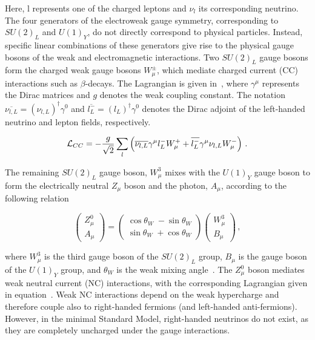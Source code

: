 \noindent Here, $\text{l}$ represents one of the charged leptons and $\nu_l$ its corresponding neutrino.
The four generators of the electroweak gauge symmetry, corresponding to $SU(2)_L$ and $U(1)_Y$, do not directly correspond to physical particles. Instead, specific linear combinations of these generators give rise to the physical gauge bosons of the weak and electromagnetic interactions. 
Two $SU(2)_L$ gauge bosons form the charged weak gauge bosons $W_{\mu}^{\pm}$, which mediate charged current (CC) interactions such as $\beta$-decays. The Lagrangian is given in~, where $\gamma^{\mu}$ represents the Dirac matrices and $g$ denotes the weak coupling constant. The notation $\overline{\nu_{l, L}} = (\nu_{l, L})^\dagger \gamma^0$ and $\overline{l^{-}_{L}} = (l_L)^\dagger \gamma^0$ denotes the Dirac adjoint of the left-handed neutrino and lepton fields, respectively.

\begin{equation}
\label{eq:Lagr_weak_CC}
    \mathcal{L}_{CC} = - \frac{g}{\sqrt{2}} \sum_l \left( \overline{\nu_{l, L}} \gamma^{\mu} l^{-}_{L} W^{+}_{\mu} + \overline{l^{-}_{L}} \gamma^{\mu} \nu_{l, L} W^{-}_{\mu} \right) \,.
\end{equation}

The remaining $SU(2)_L$ gauge boson, $W^3_{\mu}$ mixes with the $U(1)_Y$ gauge boson to form the electrically neutral $Z_{\mu}$ boson and the photon, $A_{\mu}$, according to the following relation

\begin{equation}
\label{eq:weak_mixing}
\begin{pmatrix}
    Z^0_{\mu} \\ A_{\mu}
\end{pmatrix}
= \begin{pmatrix}
    \cos \theta_W \; - \sin \theta_W \\
    \sin \theta_W \; + \cos \theta_W 
\end{pmatrix}
\begin{pmatrix}
    W^3_{\mu} \\ B_{\mu}
\end{pmatrix} \,,
\end{equation}

\noindent where $W^3_{\mu}$ is the third gauge boson of the $SU(2)_L$ group, $B_{\mu}$ is the gauge boson of the $U(1)_Y$ group, and $\theta_W$ is the weak mixing angle~\cite{weinberg_quantum_1995, navas_review_2024}. 
The $Z^0_{\mu}$ boson mediates weak neutral current (NC) interactions, with the corresponding Lagrangian given in equation~. Weak NC interactions depend on the weak hypercharge and therefore couple also to right-handed fermions (and left-handed anti-fermions). 
However, in the minimal Standard Model, right-handed neutrinos do not exist, as they are completely uncharged under the gauge interactions.


